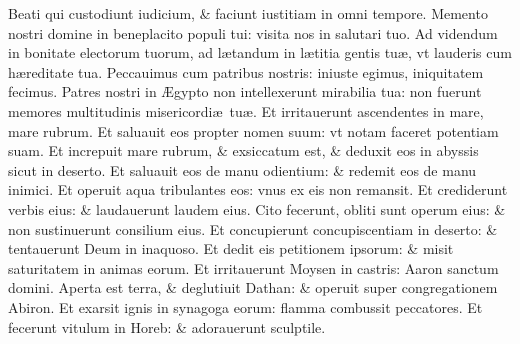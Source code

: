 \documentclass[a5paper,10pt]{book}
\def\ae{æ}
\def\AE{Æ}
\begin{document}
\begin{multicols*}{2}
\newline \color{red} B\color{black}eati qui custodiunt iudicium, \& faciunt iustitiam in omni tempore.
\newline \color{red} M\color{black}emento nostri domine in beneplacito populi tui: visita nos in salutari tuo.
\newline \color{red} A\color{black}d videndum in bonitate electorum tuorum, ad l\ae tandum in l\ae titia gentis tu\ae , vt lauderis cum h\ae reditate tua.
\newline \color{red} P\color{black}eccauimus cum patribus nostris: iniuste egimus, iniquitatem fecimus.
\newline \color{red} P\color{black}atres nostri in \AE gypto non intellexerunt mirabilia tua: non fuerunt memores multitudinis misericordi\ae \ tu\ae .
\newline \color{red} E\color{black}t irritauerunt ascendentes in mare, mare rubrum.
\newline \color{red} E\color{black}t saluauit eos propter nomen suum: vt notam faceret potentiam suam.
\newline \color{red} E\color{black}t increpuit mare rubrum, \& exsiccatum est, \& deduxit eos in abyssis sicut in deserto.
\newline \color{red} E\color{black}t saluauit eos de manu odientium: \& redemit eos de manu inimici.
\newline \color{red} E\color{black}t operuit aqua tribulantes eos: vnus ex eis non remansit.
\newline \color{red} E\color{black}t crediderunt verbis eius: \& laudauerunt laudem eius.
\newline \color{red} C\color{black}ito fecerunt, obliti sunt operum eius: \& non sustinuerunt consilium eius.
\newline \color{red} E\color{black}t concupierunt concupiscentiam in deserto: \& tentauerunt Deum in inaquoso.
\newline \color{red} E\color{black}t dedit eis petitionem ipsorum: \& misit saturitatem in animas eorum.
\newline \color{red} E\color{black}t irritauerunt Moysen in castris: Aaron sanctum domini.
\newline \color{red} A\color{black}perta est terra, \& deglutiuit Dathan: \& operuit super congregationem Abiron.
\newline \color{red} E\color{black}t exarsit ignis in synagoga eorum: flamma combussit peccatores.
\newline \color{red} E\color{black}t fecerunt vitulum in Horeb: \& adorauerunt sculptile.

\end{multicols*}
\end{document}
